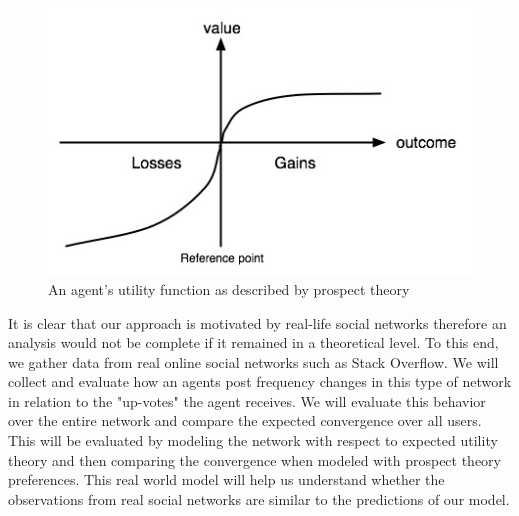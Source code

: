 \documentclass[A4paper,11pt]{article}
\begin{document}
\begin{figure}[h!]
  \centering
  \includegraphics[width=.35\linewidth]{./Valuefun.jpg}
  \caption{An agent's utility function as described by prospect theory}
  \label{fig:prospect-util}
\end{figure}

\par It is clear that our approach is motivated by real-life social networks therefore an analysis would not be complete
if it remained in a theoretical level. To this end, we gather data from real online social networks such as Stack Overflow. We will collect and evaluate how an agents post frequency changes in this type of network in relation to the "up-votes" the agent receives. We will evaluate this behavior over the entire network and compare the expected convergence over all users.  This will be evaluated by modeling the network with respect to expected utility theory and then comparing the convergence when modeled with prospect theory preferences. This real world model will help us understand whether the observations from real social networks are similar to the predictions of our model.



\label{Bibliography}




\end{document}
